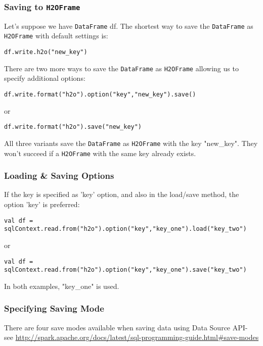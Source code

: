 \subsubsection{Saving to \texttt{H2OFrame}}

Let's suppose we have \texttt{DataFrame} df. The shortest way to save the \texttt{DataFrame} as \texttt{H2OFrame} with default settings is:
\begin{lstlisting}[style=Scala]
df.write.h2o("new_key")
\end{lstlisting}

There are two more ways to save the \texttt{DataFrame} as \texttt{H2OFrame} allowing us to specify additional options:
\begin{lstlisting}[style=Scala]
df.write.format("h2o").option("key","new_key").save()
\end{lstlisting}
or
\begin{lstlisting}[style=Scala]
df.write.format("h2o").save("new_key")
\end{lstlisting}

All three variants save the \texttt{DataFrame} as \texttt{H2OFrame} with the key "new\_key". They won't succeed if a \texttt{H2OFrame} with the same key already exists.

\subsubsection{Loading \& Saving Options}

If the key is specified as 'key' option, and also in the load/save method, the option 'key' is preferred:
\begin{lstlisting}[style=Scala]
val df = sqlContext.read.from("h2o").option("key","key_one").load("key_two")
\end{lstlisting}
or
\begin{lstlisting}[style=Scala]
val df = sqlContext.read.from("h2o").option("key","key_one").save("key_two")
\end{lstlisting}

In both examples, "key\_one" is used.

\subsubsection{Specifying Saving Mode}

There are four save modes available when saving data using Data Source API- see \url{http://spark.apache.org/docs/latest/sql-programming-guide.html#save-modes}

